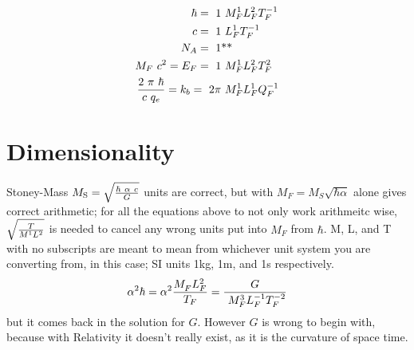 \begin{multicols}{2}
\begin{multicols}{2}[\setlength{\columnseprule}{0pt}]
\begin{align*}
\hbar = ~1 & ~M_F^{1}L_F^{2}T_F^{-1}\\
c = ~1 & ~L_F^{1}T_F^{-1}\\
N_A = ~1 &\text{**}\\
M_F~ c^2 =E_F = ~1 & ~M_F^{1}L_F^{2}T_F^{2}\\
{2~\pi~\hbar \over c ~ q_e}=k_b = ~2\pi & ~M_F^{1}L_F^{1}Q_F^{-1}
\end{align*}\noindent\end{multicols}\noindent
\noindent\section {Dimensionality}Stoney-Mass $M_{{\text{S}}} = \sqrt{\hbar ~ \alpha ~c \over G}$ units are correct, but with $M_F = M_S \sqrt{\hbar \alpha}$ alone gives correct arithmetic;
 for all the equations above to not only work arithmeitc wise, $\sqrt{T \over M^{1}L^{2}}$ is needed to cancel any wrong units put into $M_F$ from $\hbar$. M, L, and T with no subscripts are meant to mean from whichever unit system you are converting from, in this case; SI units 1kg, 1m, and 1s respectively.
$$\alpha^2\hbar= \alpha^2 {M_F^{}L_F^{2} \over T_F} ={G \over ~M_F^{3}L_F^{-1}T_F^{-2}}$$
but it comes back in the solution for $G$. However $G$ is wrong to begin with, because with Relativity it doesn't really exist, as it is the curvature of space time.

\end{multicols}
